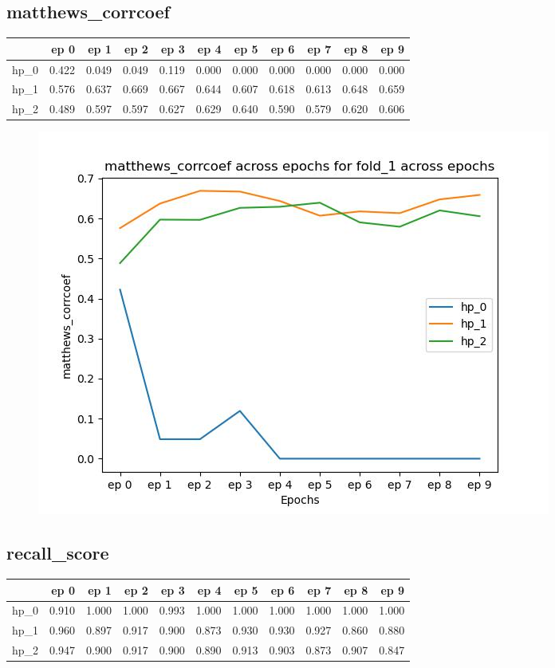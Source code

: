 \documentclass{article}
\begin{document}
\subsection{matthews\_corrcoef}
\begin{tabular}{lrrrrrrrrrr}
\toprule
{} &   ep 0 &   ep 1 &   ep 2 &   ep 3 &   ep 4 &   ep 5 &   ep 6 &   ep 7 &   ep 8 &   ep 9 \\
\midrule
hp\_0 &  0.422 &  0.049 &  0.049 &  0.119 &  0.000 &  0.000 &  0.000 &  0.000 &  0.000 &  0.000 \\
hp\_1 &  0.576 &  0.637 &  0.669 &  0.667 &  0.644 &  0.607 &  0.618 &  0.613 &  0.648 &  0.659 \\
hp\_2 &  0.489 &  0.597 &  0.597 &  0.627 &  0.629 &  0.640 &  0.590 &  0.579 &  0.620 &  0.606 \\
\bottomrule
\end{tabular}

\begin{figure}[H]
\includegraphics[scale = 0.75]{fold_1/matthews_corrcoef}
\end{figure}
\subsection{recall\_score}
\begin{tabular}{lrrrrrrrrrr}
\toprule
{} &   ep 0 &   ep 1 &   ep 2 &   ep 3 &   ep 4 &   ep 5 &   ep 6 &   ep 7 &   ep 8 &   ep 9 \\
\midrule
hp\_0 &  0.910 &  1.000 &  1.000 &  0.993 &  1.000 &  1.000 &  1.000 &  1.000 &  1.000 &  1.000 \\
hp\_1 &  0.960 &  0.897 &  0.917 &  0.900 &  0.873 &  0.930 &  0.930 &  0.927 &  0.860 &  0.880 \\
hp\_2 &  0.947 &  0.900 &  0.917 &  0.900 &  0.890 &  0.913 &  0.903 &  0.873 &  0.907 &  0.847 \\
\bottomrule
\end{tabular}
\end{document}
